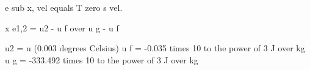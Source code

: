 e sub x, vel equals T zero s vel.

x e1,2 = u2 - u f over u g - u f  

u2 = u (0.003 degrees Celsius)  
u f = -0.035 times 10 to the power of 3 J over kg  
u g = -333.492 times 10 to the power of 3 J over kg
